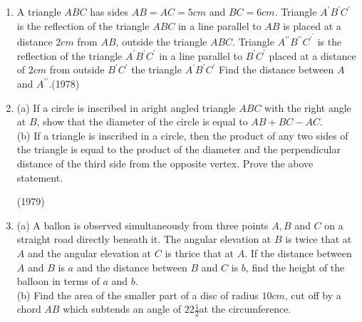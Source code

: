 \documentclass[journal,12pt,twocolumn]{IEEEtran}
\theoremstyle{remark}
\begin{document}
\begin{enumerate}
    \item A triangle $ABC$ has sides $AB=AC=5cm$ and $BC=6cm$. Triangle $A^\prime B^\prime C^\prime$ is the reflection of the triangle $ABC$ in a line parallel to $AB$ is placed at a distance $2cm$ from $AB$, outside the triangle $ABC$. Triangle $A^{\prime\prime} B^{\prime\prime} C^{\prime^\prime}$ is the reflection of the triangle $A^\prime B^\prime C^\prime$ in a line parallel to $B^\prime C^\prime$ placed at a distance of $2cm$ from outside $B^\prime C^\prime$ the triangle $A^\prime B^\prime C^\prime$ Find the distance between $A$ and $A^{\prime\prime}$.\hfill(1978)
    \item (a) If a circle is inscribed in aright angled triangle $ABC$ with the right angle at $B$, show that the diameter of the circle is equal to $AB+BC-AC$.\\
    (b) If a triangle is inscribed in a circle, then the product of any two sides of the triangle is equal to the product of the diameter and the perpendicular distance of the third side from the opposite vertex. Prove the above statement.
    
    \hfill(1979)
    \item (a) A ballon is observed simultaneously from three points $A,B$ and $C$ on a straight road directly beneath it. The angular elevation at $B$ is twice that at $A$ and the angular elevation at $C$ is thrice that at $A$. If the distance between $A$ and $B$ is $a$ and the distance between $B$ and $C$ is $b$, find the height of the balloon in terms of $a$ and $b$.\\
    (b) Find the area of the smaller part of a disc of radius $10cm$, cut off by a chord $AB$ which subtends an angle of $22\frac{1}{2}$\textdegree at the circumference.


\end{enumerate}
\end{document}
